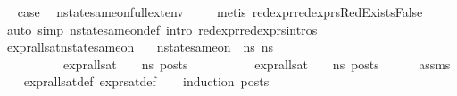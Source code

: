 \begin{isabellebody}
\ \isamarkupfalse%
\ {\isacharquery}{\kern0pt}case\ \isamarkupfalse%
\ nstate{\isacharunderscore}{\kern0pt}same{\isacharunderscore}{\kern0pt}on{\isacharunderscore}{\kern0pt}full{\isacharunderscore}{\kern0pt}ext{\isacharunderscore}{\kern0pt}env\isanewline
\ \ \ \isamarkupfalse%
\ {\isacharparenleft}{\kern0pt}metis\ red{\isacharunderscore}{\kern0pt}expr{\isacharunderscore}{\kern0pt}red{\isacharunderscore}{\kern0pt}exprs{\isachardot}{\kern0pt}RedExistsFalse{\isacharparenright}{\kern0pt}\ \isanewline
{}\isamarkupfalse%
\ {\isacharparenleft}{\kern0pt}auto\ simp{\isacharcolon}{\kern0pt}\ nstate{\isacharunderscore}{\kern0pt}same{\isacharunderscore}{\kern0pt}on{\isacharunderscore}{\kern0pt}def\ intro{\isacharcolon}{\kern0pt}\ red{\isacharunderscore}{\kern0pt}expr{\isacharunderscore}{\kern0pt}red{\isacharunderscore}{\kern0pt}exprs{\isachardot}{\kern0pt}intros{\isacharparenright}{\kern0pt}%
\endisatagproof
{\isafoldproof}%
%
\isadelimproof
\isanewline
%
\endisadelimproof
\isanewline
{}\isamarkupfalse%
\ expr{\isacharunderscore}{\kern0pt}all{\isacharunderscore}{\kern0pt}sat{\isacharunderscore}{\kern0pt}nstate{\isacharunderscore}{\kern0pt}same{\isacharunderscore}{\kern0pt}on{\isacharcolon}{\kern0pt}\isanewline
\ \ \ {\isachardoublequoteopen}nstate{\isacharunderscore}{\kern0pt}same{\isacharunderscore}{\kern0pt}on\ {\isasymLambda}\ ns{}\ ns{}\ {\isacharbraceleft}{\kern0pt}{\isacharbraceright}{\kern0pt}{\isachardoublequoteclose}\ \isanewline
\ \ \ \ \ \ \ \ \ \ {\isachardoublequoteopen}expr{\isacharunderscore}{\kern0pt}all{\isacharunderscore}{\kern0pt}sat\ {\isasymLambda}\ {\isasymGamma}\ {\isasymOmega}\ ns{}\ posts{\isachardoublequoteclose}\ \isanewline
\ \ \ \ \ \ \ \ \ {\isachardoublequoteopen}expr{\isacharunderscore}{\kern0pt}all{\isacharunderscore}{\kern0pt}sat\ {\isasymLambda}\ {\isasymGamma}\ {\isasymOmega}\ ns{}\ posts{\isachardoublequoteclose}\ \ \isanewline
%
\isadelimproof
\ \ %
\endisadelimproof
%
\isatagproof
{}\isamarkupfalse%
\ assms{\isacharparenleft}{\kern0pt}{}{\isacharparenright}{\kern0pt}\isanewline
\ \ \isamarkupfalse%
\ expr{\isacharunderscore}{\kern0pt}all{\isacharunderscore}{\kern0pt}sat{\isacharunderscore}{\kern0pt}def\ expr{\isacharunderscore}{\kern0pt}sat{\isacharunderscore}{\kern0pt}def\isanewline
\ \ \isamarkupfalse%
\ {\isacharparenleft}{\kern0pt}induction\ posts{\isacharparenright}{\kern0pt}\isanewline

\end{isabellebody}
